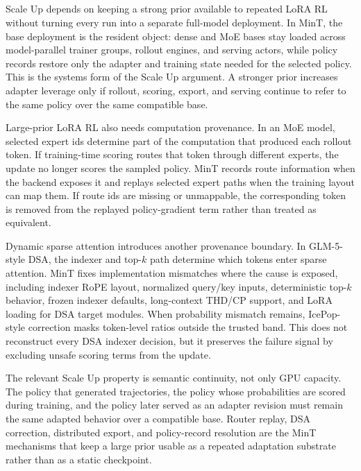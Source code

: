 \subsection{}\label{subsec:infra-scale-up-provenance}

Scale Up depends on keeping a strong prior available to repeated LoRA RL without turning every run into a separate full-model deployment. In MinT, the base deployment is the resident object: dense and MoE bases stay loaded across model-parallel trainer groups, rollout engines, and serving actors, while policy records restore only the adapter and training state needed for the selected policy. This is the systems form of the Scale Up argument. A stronger prior increases adapter leverage only if rollout, scoring, export, and serving continue to refer to the same policy over the same compatible base.

Large-prior LoRA RL also needs computation provenance. In an MoE model, selected expert ids determine part of the computation that produced each rollout token. If training-time scoring routes that token through different experts, the update no longer scores the sampled policy. MinT records route information when the backend exposes it and replays selected expert paths when the training layout can map them. If route ids are missing or unmappable, the corresponding token is removed from the replayed policy-gradient term rather than treated as equivalent.

Dynamic sparse attention introduces another provenance boundary. In GLM-5-style DSA, the indexer and top-$k$ path determine which tokens enter sparse attention. MinT fixes implementation mismatches where the cause is exposed, including indexer RoPE layout, normalized query/key inputs, deterministic top-$k$ behavior, frozen indexer defaults, long-context THD/CP support, and LoRA loading for DSA target modules. When probability mismatch remains, IcePop-style correction masks token-level ratios outside the trusted band. This does not reconstruct every DSA indexer decision, but it preserves the failure signal by excluding unsafe scoring terms from the update.

The relevant Scale Up property is semantic continuity, not only GPU capacity. The policy that generated trajectories, the policy whose probabilities are scored during training, and the policy later served as an adapter revision must remain the same adapted behavior over a compatible base. Router replay, DSA correction, distributed export, and policy-record resolution are the MinT mechanisms that keep a large prior usable as a repeated adaptation substrate rather than as a static checkpoint.

